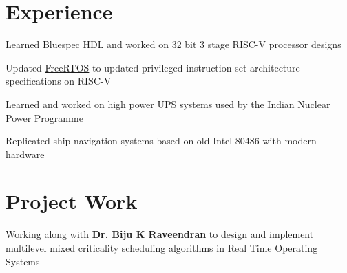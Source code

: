 \documentclass[]{illustris-resume-openfont}
\begin{document}
\hfill
\begin{minipage}[t]{0.66\textwidth} 


\section{Experience}

\vspace{\topsep} %
\begin{tightemize}\item Learned Bluespec HDL and worked on 32 bit 3 stage RISC-V processor designs
\item Updated \href{https://github.com/illustris/freertos-riscv}{FreeRTOS} to updated privileged instruction set architecture specifications on RISC-V
\end{tightemize}
\sectionsep

\begin{tightemize}\item Learned and worked on high power UPS systems used by the Indian Nuclear Power Programme
\item Replicated ship navigation systems based on old Intel 80486 with modern hardware                                                                                                                                                                                                                                                                                                                                                                                                                                                                 
\end{tightemize}


\section{Project Work}
Working along with \textbf{\href{http://universe.bits-pilani.ac.in/goa/biju/profile}{Dr. Biju K Raveendran}} to design and implement multilevel mixed criticality scheduling algorithms in Real Time Operating Systems
\sectionsep


\end{minipage}
\end{document}

